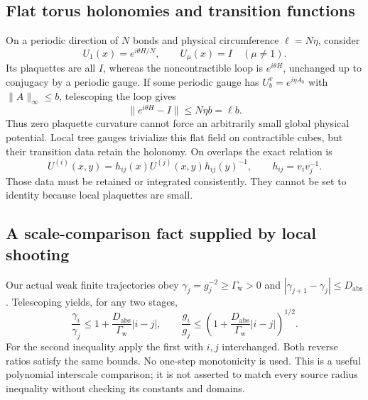 \subsection{Flat torus holonomies and transition functions}
\label{fmg-holonomy}

On a periodic direction of \(N\) bonds and physical circumference
\(\ell=N\eta\), consider
\[
       U_1(x)=e^{i\theta H/N},\qquad U_\mu(x)=I\quad(\mu\ne1).
\]
Its plaquettes are all \(I\), whereas the noncontractible loop is
\(e^{i\theta H}\), unchanged up to conjugacy by a periodic gauge.
If some periodic gauge has \(U_b^v=e^{i\eta A_b}\) with
\(\|A\|_\infty\le b\), telescoping the loop gives
\begin{equation}
                  \|e^{i\theta H}-I\|\le N\eta b=\ell b.
 \label{fmg-holonomy-bound}
\end{equation}
Thus zero plaquette curvature cannot force an arbitrarily small
global physical potential. Local tree gauges trivialize this
flat field on contractible cubes, but their transition data
retain the holonomy. On overlaps the exact relation is
\begin{equation}
 U^{(i)}(x,y)=h_{ij}(x)U^{(j)}(x,y)h_{ij}(y)^{-1},
 \qquad h_{ij}=v_i v_j^{-1}.
 \label{fmg-transitions}
\end{equation}
Those data must be retained or integrated consistently. They
cannot be set to identity because local plaquettes are small.

\subsection{A scale-comparison fact supplied by local shooting}
\label{fmg-couplings}

Our actual weak finite trajectories obey
\(\gamma_j=g_j^{-2}\ge\Gamma_{\mathrm w}>0\) and
\(|\gamma_{j+1}-\gamma_j|\le D_{\mathrm{abs}}\).
Telescoping yields, for any two stages,
\begin{equation}
 \frac{\gamma_i}{\gamma_j}
       \le1+\frac{D_{\mathrm{abs}}}{\Gamma_{\mathrm w}}|i-j|,
 \qquad
 \frac{g_i}{g_j}
       \le\left(1+\frac{D_{\mathrm{abs}}}
                          {\Gamma_{\mathrm w}}|i-j|\right)^{1/2}.
 \label{fmg-coupling-comparison}
\end{equation}
For the second inequality apply the first with \(i,j\) interchanged.
Both reverse ratios satisfy the same bounds. No one-step
monotonicity is used. This is a useful polynomial interscale
comparison; it is not asserted to match every source radius
inequality without checking its constants and domains.


